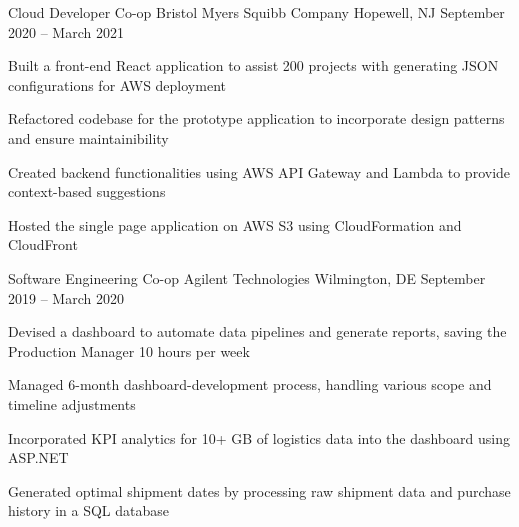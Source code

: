 \begin{cventries}
	\cventry
	{Cloud Developer Co-op}
	{Bristol Myers Squibb Company}
	{Hopewell, NJ}
	{September 2020 – March 2021}
	{\begin{cvitems}
        \item {Built a front-end React application to assist 200 projects with generating JSON configurations for AWS deployment}
        \item {Refactored codebase for the prototype application to incorporate design patterns and ensure maintainibility}
        \item {Created backend functionalities using AWS API Gateway and Lambda to provide context-based suggestions}
        \item {Hosted the single page application on AWS S3 using CloudFormation and CloudFront}
		\end{cvitems}}
	
	\cventry
	{Software Engineering Co-op}
	{Agilent Technologies}
	{Wilmington, DE}
	{September 2019 – March 2020}
	{\begin{cvitems}
	    \item {Devised a dashboard to automate data pipelines and generate reports, saving the Production Manager 10 hours per week}
        \item {Managed 6-month dashboard-development process, handling various scope and timeline adjustments}
		\item {Incorporated KPI analytics for 10+ GB of logistics data into the dashboard using ASP.NET}
        \item {Generated optimal shipment dates by processing raw shipment data and purchase history in a SQL database}
		\end{cvitems}}
	

\end{cventries}
